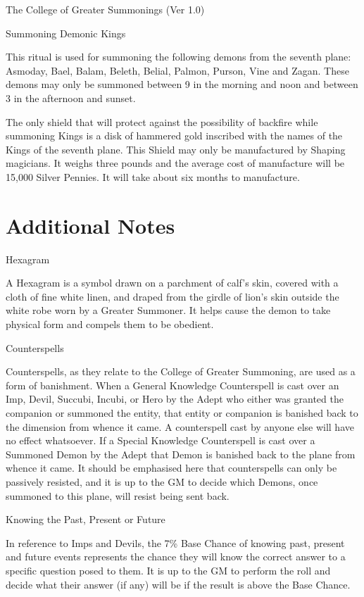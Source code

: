 \begin{Chapter}{The College of Greater Summonings (Ver 1.0)}
\begin{ritual}[R-6]{Summoning Demonic Kings }

\begin{effects}
This ritual is used for summoning the following demons from the
seventh plane: Asmoday, Bael, Balam, Beleth, Belial, Palmon, Purson,
Vine and Zagan. These demons may only be summoned between 9 in the
morning and noon and between 3 in the afternoon and sunset.

The only shield that will protect against the possibility of backfire
while summoning Kings is a disk of hammered gold inscribed with the
names of the Kings of the seventh plane.  This Shield may only be
manufactured by Shaping magicians.  It weighs three pounds and the
average cost of manufacture will be 15,000 Silver Pennies. It will
take about six months to manufacture.
\end{effects}
\end{ritual}


\section{Additional Notes}

Hexagram 

A Hexagram is a symbol drawn on a parchment of calf’s skin, covered
with a cloth of fine white linen, and draped from the girdle of lion’s
skin outside the white robe worn by a Greater Summoner.  It helps
cause the demon to take physical form and compels them to be obedient.

Counterspells 

Counterspells, as they relate to the College of Greater Summoning, are
used as a form of banishment. When a General Knowledge Counterspell is
cast over an Imp, Devil, Succubi, Incubi, or Hero by the Adept who
either was granted the companion or summoned the entity, that entity
or companion is banished back to the dimension from whence it came.  A
counterspell cast by anyone else will have no effect whatsoever. If a
Special Knowledge Counterspell is cast over a Summoned Demon by the
Adept that Demon is banished back to the plane from whence it came. It
should be emphasised here that counterspells can only be passively
resisted, and it is up to the GM to decide which Demons, once summoned
to this plane, will resist being sent back.

Knowing the Past, Present or Future 

In reference to Imps and Devils, the 7\% Base Chance of knowing past,
present and future events represents the chance they will know the
correct answer to a specific question posed to them.  It is up to the
GM to perform the roll and decide what their answer (if any) will be
if the result is above the Base Chance.
\end{Chapter}
